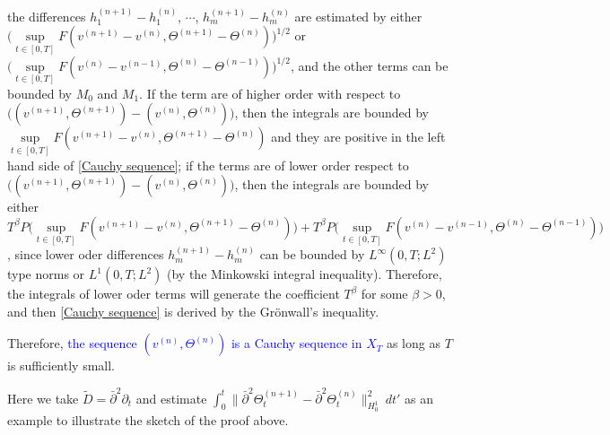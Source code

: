 \documentclass[12pt,a4paper]{amsart}
\numberwithin{equation}{section}
\theoremstyle{plain}
\theoremstyle{definition}
\newcommand{\bpartial}{\bar{\partial}}
\begin{document}
the differences $h_1^{(n+1)}-h_1^{(n)}$, $\cdots$, $h_m^{(n+1)}-h_m^{(n)}$ are estimated by either $\Big(\sup\limits_{t\in[0,T]}F(v^{(n+1)}-v^{(n)},\Theta^{(n+1)}-\Theta^{(n)})\Big)^{1/2}$ or $\Big(\sup\limits_{t\in[0,T]}F(v^{(n)}-v^{(n-1)},\Theta^{(n)}-\Theta^{(n-1)})\Big)^{1/2}$, and the other terms can be bounded by $M_0$ and $M_1$.
If %
the term are of higher order with respect to $\Big((v^{(n+1)},\Theta^{(n+1)})-(v^{(n)},\Theta^{(n)})\Big)$, then the integrals are bounded by $\sup\limits_{t\in[0,T]}F(v^{(n+1)}-v^{(n)},\Theta^{(n+1)}-\Theta^{(n)})$ and they are positive in the left hand side of \eqref{Cauchy sequence};
if %
the terms are of lower order respect to $\Big((v^{(n+1)},\Theta^{(n+1)})-(v^{(n)},\Theta^{(n)})\Big)$, then the integrals are bounded by either $T^{\beta}P\Big(\sup\limits_{t\in[0,T]}F(v^{(n+1)}-v^{(n)},\Theta^{(n+1)}-\Theta^{(n)})\Big)+ T^{\beta}P\Big(\sup\limits_{t\in[0,T]}F(v^{(n)}-v^{(n-1)},\Theta^{(n)}-\Theta^{(n-1)})\Big)$, since lower oder differences $h_m^{(n+1)}-h_m^{(n)}$ can be bounded by $L^{\infty}(0,T;L^2)$ type norms or $L^{1}(0,T;L^2)$ (by the Minkowski integral inequality).
Therefore, the integrals of lower oder terms will generate the coefficient $T^{\beta}$ for some $\beta>0$, and then \eqref{Cauchy sequence} is derived by the Gr\"{o}nwall's inequality.

Therefore, \textcolor{blue}{the sequence $(v^{(n)},\Theta^{(n)})$ is a Cauchy sequence in $X_T$} as long as $T$ is sufficiently small.

\vspace{0.7cm}
Here we take $\widetilde{D}=\bpartial^2 \partial_t$ and %
estimate $\int_{0}^{t}\|\bpartial^2 \Theta^{(n+1)}_{t}-\bpartial^2 \Theta^{(n)}_{t}\|_{H_0^1}^2\ dt'$
as an example to illustrate the sketch of the proof above.
\end{document}
